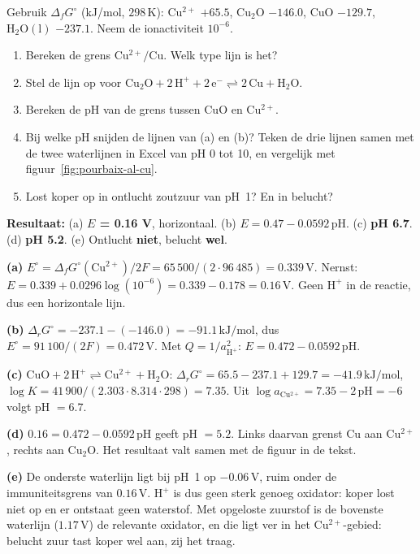 \begin{oefening}
Gebruik \(\Delta_fG^\circ\) (kJ/mol, \(298\,\mathrm{K}\)): \(\mathrm{Cu^{2+}}\) \(+65.5\), \(\mathrm{Cu_2O}\) \(-146.0\), \(\mathrm{CuO}\) \(-129.7\), \(\mathrm{H_2O(l)}\) \(-237.1\). Neem de ionactiviteit \(10^{-6}\).

\begin{enumerate}
\item[(a)]
  Bereken de grens \(\mathrm{Cu^{2+}/Cu}\). Welk type lijn is het?
\item[(b)]
  Stel de lijn op voor \(\mathrm{Cu_2O + 2\,H^+ + 2\,e^- \rightleftharpoons 2\,Cu + H_2O}\).
\item[(c)]
  Bereken de pH van de grens tussen \(\mathrm{CuO}\) en \(\mathrm{Cu^{2+}}\).
\item[(d)]
  Bij welke pH snijden de lijnen van (a) en (b)? Teken de drie lijnen samen met de twee waterlijnen in Excel van pH 0 tot 10, en vergelijk met figuur~\ref{fig:pourbaix-al-cu}.
\item[(e)]
  Lost koper op in ontlucht zoutzuur van pH~1? En in belucht?
\end{enumerate}
\end{oefening}
\begin{oplossing}
\textbf{Resultaat:} (a) \textbf{\(E\) = 0.16 V}, horizontaal. (b) \textbf{\(E = 0.47 - 0.0592\,\mathrm{pH}\)}. (c) \textbf{pH 6.7}. (d) \textbf{pH 5.2}. (e) Ontlucht \textbf{niet}, belucht \textbf{wel}.

\textbf{(a)} \(E^\circ = \Delta_fG^\circ(\mathrm{Cu^{2+}})/2F = 65\,500/(2\cdot96\,485) = 0.339\,\mathrm{V}\). Nernst: \(E = 0.339 + 0.0296\log(10^{-6}) = 0.339 - 0.178 = 0.16\,\mathrm{V}\). Geen \(\mathrm{H^+}\) in de reactie, dus een horizontale lijn.

\textbf{(b)} \(\Delta_rG^\circ = -237.1 - (-146.0) = -91.1\,\mathrm{kJ/mol}\), dus \(E^\circ = 91\,100/(2F) = 0.472\,\mathrm{V}\). Met \(Q = 1/a_{\mathrm{H^+}}^2\): \(E = 0.472 - 0.0592\,\mathrm{pH}\).

\textbf{(c)} \(\mathrm{CuO + 2\,H^+ \rightleftharpoons Cu^{2+} + H_2O}\): \(\Delta_rG^\circ = 65.5 - 237.1 + 129.7 = -41.9\,\mathrm{kJ/mol}\), \(\log K = 41\,900/(2.303\cdot8.314\cdot298) = 7.35\). Uit \(\log a_{\mathrm{Cu^{2+}}} = 7.35 - 2\,\mathrm{pH} = -6\) volgt pH \(= 6.7\).

\textbf{(d)} \(0.16 = 0.472 - 0.0592\,\mathrm{pH}\) geeft pH \(= 5.2\). Links daarvan grenst Cu aan \(\mathrm{Cu^{2+}}\), rechts aan \(\mathrm{Cu_2O}\). Het resultaat valt samen met de figuur in de tekst.

\textbf{(e)} De onderste waterlijn ligt bij pH~1 op \(-0.06\,\mathrm{V}\), ruim onder de immuniteitsgrens van \(0.16\,\mathrm{V}\). \(\mathrm{H^+}\) is dus geen sterk genoeg oxidator: koper lost niet op en er ontstaat geen waterstof. Met opgeloste zuurstof is de bovenste waterlijn (\(1.17\,\mathrm{V}\)) de relevante oxidator, en die ligt ver in het \(\mathrm{Cu^{2+}}\)-gebied: belucht zuur tast koper wel aan, zij het traag.
\end{oplossing}

